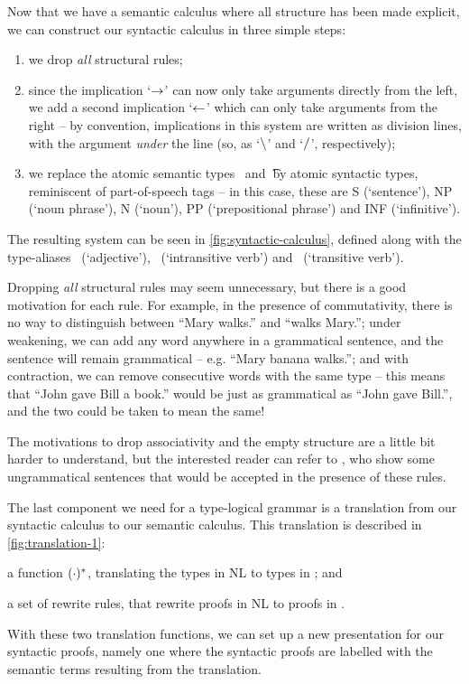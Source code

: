 \documentclass[a4paper]{article}
\begin{document}
Now that we have a semantic calculus where all structure has been made
explicit, we can construct our syntactic calculus in three simple
steps:
\begin{enumerate}
\item%
  we drop \emph{all} structural rules;
\item%
  since the implication `$\rightarrow$' can now only take arguments directly
  from the left, we add a second implication `$\leftarrow$' which can only
  take arguments from the right -- by convention, implications in this
  system are written as division lines, with the argument \emph{under}
  the line (so, as `$\mathbin{\backslash}$' and `$\mathbin{\slash}$', respectively);
\item%
  we replace the atomic semantic types \e\ and \t\ by atomic syntactic
  types, reminiscent of part-of-speech tags -- in this case, these
  are S (`sentence'), NP (`noun phrase'), N (`noun'), PP
  (`prepositional phrase') and INF (`infinitive').
\end{enumerate}
The resulting system can be seen in \autoref{fig:syntactic-calculus},
defined along with the type-aliases \A\ (`adjective'), \IV\
(`intransitive verb') and \TV\ (`transitive verb').



Dropping \emph{all} structural rules may seem unnecessary, but there
is a good motivation for each rule.  For example, in the presence of
commutativity, there is no way to distinguish between ``Mary walks.''
and ``walks Mary.''; under weakening, we can add any word anywhere in a
grammatical sentence, and the sentence will remain grammatical --
e.g. ``Mary banana walks.''; and with contraction, we can remove
consecutive words with the same type -- this means that ``John gave
Bill a book.'' would be just as grammatical as ``John gave Bill.'',
and the two could be taken to mean the same!

The motivations to drop associativity and the empty structure are a
little bit harder to understand, but the interested reader can refer
to \citet[p. 33, 105-106]{moot2012}, who show some ungrammatical
sentences that would be accepted in the presence of these rules.

The last component we need for a type-logical grammar is a translation
from our syntactic calculus to our semantic calculus. This translation
is described in \autoref{fig:translation-1}:
\begin{enumerate*}[label=(\arabic*)]
\item a function $({\cdot})^*$, translating the types in NL to types in
  \lamET; and
\item a set of rewrite rules, that rewrite proofs in NL to proofs in
  \lamET.
\end{enumerate*}
With these two translation functions, we can set up a new presentation
for our syntactic proofs, namely one where the syntactic proofs are
labelled with the semantic terms resulting from the translation.
\end{document}
